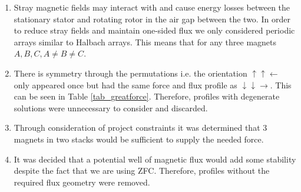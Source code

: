 \begin{enumerate}
\item Stray magnetic fields may interact with and cause energy losses between the stationary stator and rotating rotor in the air gap between the two.  In order to reduce stray fields and maintain one-sided flux we only considered periodic arrays similar to Halbach arrays.  This means that for any three magnets $A, B, C, A \neq B \neq C$.
\item There is symmetry through the permutations i.e. the orientation $\uparrow \uparrow \leftarrow$ only appeared once but had the same force and flux profile as $\downarrow \downarrow \rightarrow$.  This can be seen in Table \ref{tab_greatforce}. Therefore, profiles with degenerate solutions were unnecessary to consider and discarded.
\item Through consideration of project constraints it was determined that 3 magnets in two stacks would be sufficient to supply the needed force. 
\item It was decided that a potential well of magnetic flux would add some stability despite the fact that we are using ZFC.  Therefore, profiles without the required flux geometry were removed. 
\end{enumerate}

